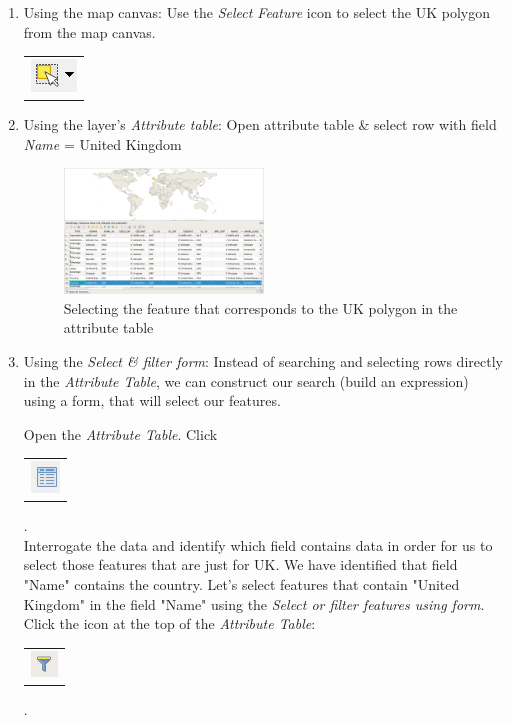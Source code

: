 \begin{enumerate}
	\item 
	Using the map canvas: Use the \textit{Select Feature} icon to select the UK polygon from the map canvas.
	\begin{tabular}{@{}c@{}}\includegraphics[width=4ex]{images/select_features_by_polygon_icon.png}\end{tabular}
	\item 
	Using the layer's \textit{Attribute table}: Open attribute table \& select row with field \textit{Name} = United Kingdom
	
	\begin{figure}[!h]
		\centering
		\includegraphics[width=0.5\textwidth]{images/world_select_uk.png}
		\caption{Selecting the feature that corresponds to the UK polygon in the attribute table}
		\label{ft_fig_firstfig3}
	\end{figure}
	\item
	Using the \textit{Select \& filter form}: Instead of searching and selecting rows directly in the \textit{Attribute Table}, we can construct our search (build an expression) using a form, that will select our features.
	
	Open the \textit{Attribute Table}. Click	\begin{tabular}{@{}c@{}}\includegraphics[width=4ex]{images/attribute_table_icon.png}\end{tabular}.\\
	
	Interrogate the data and identify which field contains data in order for us to select those features that are just for UK. We have identified that field "Name" contains the country. Let's select features that contain "United Kingdom" in the field "Name" using the \textit{Select or filter features using form}. \\
	Click the icon at the top of the \textit{Attribute Table}: 
	\begin{tabular}{@{}c@{}}\includegraphics[width=4ex]{images/select_features_form_icon.png}\end{tabular}.\\
	

\end{enumerate}
